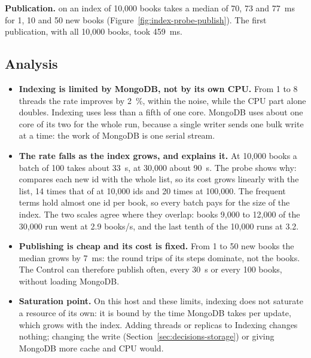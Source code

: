 \textbf{Publication.}  on an index of 10,000 books takes a median of 70, 73 and 77~ms for 1, 10
and 50 new books (Figure~\ref{fig:index-probe-publish}). The first publication, with all 10,000 books, took 459~ms.

\subsection{Analysis}

\begin{itemize}
  \item \textbf{Indexing is limited by MongoDB, not by its own CPU.} From 1 to 8 threads the rate improves by 2~\%,
        within the noise, while the CPU part alone doubles. Indexing uses less than a fifth of one core. MongoDB uses
        about one core of its two for the whole run, because a single writer sends one bulk write at a time: the work
        of MongoDB is one serial stream.
  \item \textbf{The rate falls as the index grows, and  explains it.} At 10,000 books a batch of 100
        takes about 33~s, at 30,000 about 90~s. The probe shows why:  compares each new id with the
        whole list, so its cost grows linearly with the list, 14 times that of  at 10,000 ids and 20 times
        at 100,000. The frequent terms hold almost one id per book, so every batch pays for the size of the index.
        The two scales agree where they overlap: books 9,000 to 12,000 of the 30,000 run went at 2.9 books/s, and the
        last tenth of the 10,000 runs at 3.2.
  \item \textbf{Publishing is cheap and its cost is fixed.} From 1 to 50 new books the median grows by 7~ms: the round
        trips of its steps dominate, not the books. The Control can therefore publish often, every 30~s or every 100
        books, without loading MongoDB.
  \item \textbf{Saturation point.} On this host and these limits, indexing does not saturate a resource of its own: it
        is bound by the time MongoDB takes per update, which grows with the index. Adding threads or replicas to
        Indexing changes nothing; changing the write (Section~\ref{sec:decisions-storage}) or giving MongoDB more cache
        and CPU would.
\end{itemize}

